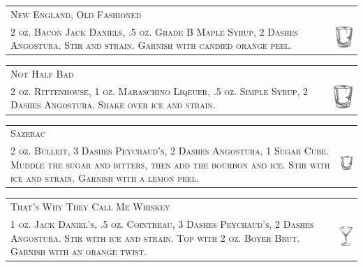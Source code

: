 \documentclass{article}
\begin{document}
\begin{tabular}{b{2.5in} m{0.625in}}
  \multicolumn{2}{p{3.5in}}{\centering\Huge\textsc{New England, Old Fashioned}} \\ 
  
  \textsc{2 oz. Bacon Jack Daniels, .5 oz. Grade B Maple Syrup, 2
    Dashes Angostura. Stir and strain. Garnish with candied orange
    peel.} & \includegraphics[width=0.5in]{rocks_glass.png}
\end{tabular}

\begin{tabular}{b{2.5in} m{0.625in}}
  \multicolumn{2}{p{3.5in}}{\centering\Huge\textsc{Not Half Bad}} \\ 
  
  \textsc{2 oz. Rittenhouse, 1 oz. Maraschino Liqeuer, .5 oz. Simple
    Syrup, 2 Dashes Angostura. Shake over ice and strain.} &
  \includegraphics[width=0.5in]{rocks_glass.png}
\end{tabular}

\begin{tabular}{b{2.5in} m{0.625in}}
  \multicolumn{2}{p{3.5in}}{\centering\Huge\textsc{Sazerac}} \\ 
  
  \textsc{2 oz. Bulleit, 3 Dashes Peychaud's, 2 Dashes Angostura, 1
    Sugar Cube.  Muddle the sugar and bitters, then add the bourbon
    and ice. Stir with ice and strain. Garnish with a lemon peel.} &
  \includegraphics[width=0.5in]{rocks_glass.png}
\end{tabular}

\begin{tabular}{b{2.5in} m{0.625in}}
  \multicolumn{2}{p{3.5in}}{\centering\Huge\textsc{That's Why They Call Me Whiskey}} \\ 
  
  \textsc{1 oz. Jack Daniel's, .5 oz. Cointreau, 3 Dashes Peychaud's,
    2 Dashes Angostura. Stir with ice and strain. Top with 2 oz.
    Boyer Brut. Garnish with an orange twist.} &
  \includegraphics[width=0.5in]{goblet.png}
\end{tabular}
\end{document}
